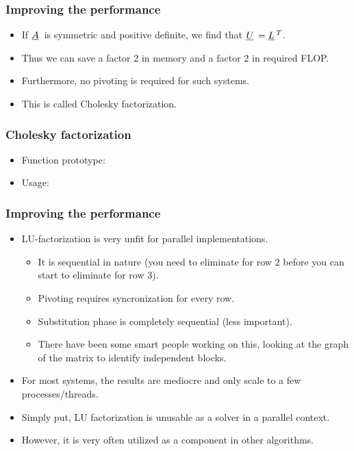 \documentclass{beamer}
\newcommand{\ub}[1]{\underbar{$#1$}\,}
\begin{document}
\begin{frame}\frametitle{Improving the performance}
  \begin{itemize}
    \item If $\ub{A}$ is symmetric and positive definite, we find that $\ub{U}=\ub{L}^T$.
    \item Thus we can save a factor 2 in memory and a factor 2 in required FLOP.
    \item Furthermore, no pivoting is required for such systems.
    \item This is called Cholesky factorization.
  \end{itemize}
\end{frame}
\begin{frame}\frametitle{Cholesky factorization}
  \begin{itemize}
    \item Function prototype:
      
    \item Usage:
      
  \end{itemize}
\end{frame}
\begin{frame}\frametitle{Improving the performance}
  \begin{itemize}
     \item LU-factorization is very unfit for parallel implementations.
       \begin{itemize}
         \item It is sequential in nature (you need to eliminate for row 2 before you
           can start to eliminate for row 3).
         \item Pivoting requires syncronization for every row.
         \item Substitution phase is completely sequential (less important).
         \item There have been some smart people working on this, looking at the
           graph of the matrix to identify independent blocks.
       \end{itemize}
     \item For most systems, the results are mediocre and only scale to a 
           few processes/threads.
     \item Simply put, LU factorization is unusable as a solver in a parallel context.
     \item However, it is very often utilized as a component in other algorithms.
  \end{itemize}
\end{frame}
\end{document}
